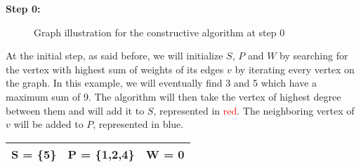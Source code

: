     \begin{minipage}{\linewidth}
        \textbf{Step 0:} \newline
        \begin{minipage}{0.4\textwidth}
            \begin{figure}[H]
                \centering
                \caption{Graph illustration for the constructive algorithm at step 0}
                \label{fig:constructive-mewc-edge}
            \end{figure}
        \end{minipage}
        \begin{minipage}{0.6\textwidth}
            At the initial step, as said before, we will initialize $S$, $P$ and $W$ by searching for the vertex with highest sum of weights of its edges $v$ by iterating every vertex on the graph. In this example, we will eventually find 3 and 5 which have a maximum sum of 9. The algorithm will then take the vertex of highest degree between them and will add it to $S$, represented in \textcolor{red}{red}. The neighboring vertex of $v$ will be added to $P$, represented in \textcolor{Cerulean}{blue}.
    
            \begin{center}
                \begin{tabular}{|lll|}
                    \hline
                    S = \{5\} & P = \{1,2,4\} & W = 0 \\
                    \hline
                \end{tabular}
            \end{center}
        \end{minipage}
    \end{minipage} 
    
